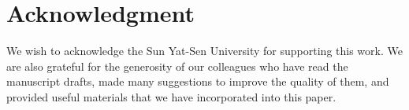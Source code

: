 \documentclass[conference]{IEEEtran}
\begin{document}
\section*{Acknowledgment}

We wish to acknowledge the Sun Yat-Sen University for supporting this work. We are also grateful for the generosity of our colleagues who have read the manuscript drafts, made many suggestions to improve the quality of them, and provided useful materials that we have incorporated into this paper. 



\end{document}
